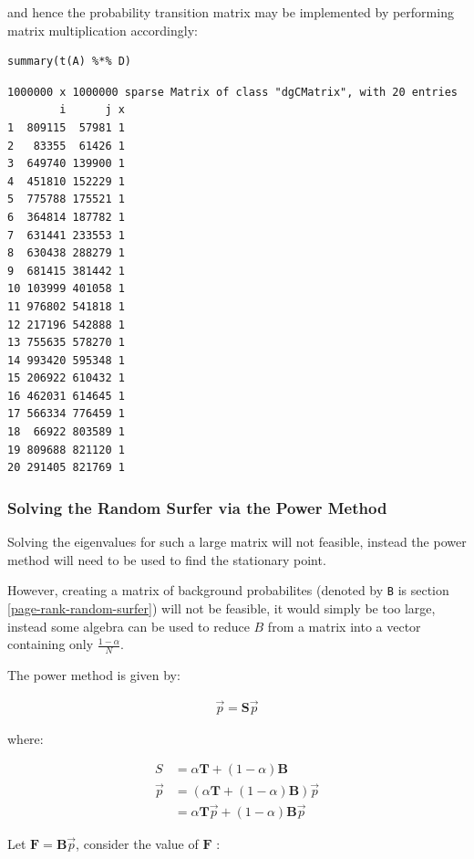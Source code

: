 \documentclass[11pt]{article}
\begin{document}
and hence the probability transition matrix may be implemented by performing matrix multiplication accordingly:

\lstset{language=r,label= ,caption= ,captionpos=b,numbers=none}
\begin{lstlisting}
summary(t(A) %*% D)
\end{lstlisting}

\begin{verbatim}
1000000 x 1000000 sparse Matrix of class "dgCMatrix", with 20 entries
        i      j x
1  809115  57981 1
2   83355  61426 1
3  649740 139900 1
4  451810 152229 1
5  775788 175521 1
6  364814 187782 1
7  631441 233553 1
8  630438 288279 1
9  681415 381442 1
10 103999 401058 1
11 976802 541818 1
12 217196 542888 1
13 755635 578270 1
14 993420 595348 1
15 206922 610432 1
16 462031 614645 1
17 566334 776459 1
18  66922 803589 1
19 809688 821120 1
20 291405 821769 1
\end{verbatim}

\subsubsection{Solving the Random Surfer via the Power Method}
\label{sec:orgfdc49ab}
Solving the eigenvalues for such a large matrix will not feasible, instead the power method will need to be used to find the stationary point.

However, creating a matrix of background probabilites (denoted by \texttt{B} is section \ref{page-rank-random-surfer}) will not be feasible, it would simply be too large, instead some algebra can be used to reduce \(B\) from a matrix into a vector containing only \(\frac{1-\alpha}{N}\).

The power method is given by:

\begin{align}
\vec{p}= \mathbf{S} \vec{p}
\end{align}

where:

\begin{align}
S &= \alpha \mathbf{T} +  \left( 1 - \alpha \right) \mathbf{B} \\
\vec{p} &= \left( \alpha \mathbf{T} +  \left( 1 - \alpha \right) \mathbf{B} \right) \vec{p}\\
&= \alpha \mathbf{T}\vec{p} +  \left( 1-\alpha \right) \mathbf{B} \vec{p}
\end{align}

Let \(\mathbf{F}= \mathbf{B}\vec{p}\), consider the value of \(\mathbf{F}\) :
\end{document}
